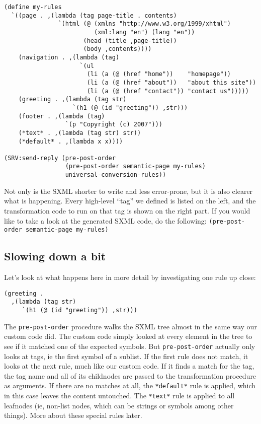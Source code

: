 \documentclass{article}
\begin{document}
\begin{verbatim}
(define my-rules
  `((page . ,(lambda (tag page-title . contents)
               `(html (@ (xmlns "http://www.w3.org/1999/xhtml")
                         (xml:lang "en") (lang "en"))
                      (head (title ,page-title))
                      (body ,contents))))
    (navigation . ,(lambda (tag)
                     `(ul
                       (li (a (@ (href "home"))    "homepage"))
                       (li (a (@ (href "about"))   "about this site"))
                       (li (a (@ (href "contact")) "contact us")))))
    (greeting . ,(lambda (tag str)
                   `(h1 (@ (id "greeting")) ,str)))
    (footer . ,(lambda (tag)
                 `(p "Copyright (c) 2007")))
    (*text* . ,(lambda (tag str) str))
    (*default* . ,(lambda x x))))

(SRV:send-reply (pre-post-order
                 (pre-post-order semantic-page my-rules)
                 universal-conversion-rules))
\end{verbatim}

Not only is the SXML shorter to write and less error-prone, but it is
also clearer what is happening.  Every high-level ``tag'' we defined
is listed on the left, and the transformation code to run on that tag
is shown on the right part.  If you would like to take a look at the
generated SXML code, do the following:
\verb|(pre-post-order semantic-page my-rules)|


\subsection{Slowing down a bit}

Let's look at what happens here in more detail by investigating one
rule up close:

\begin{verbatim}
(greeting .
  ,(lambda (tag str)
     `(h1 (@ (id "greeting")) ,str)))
\end{verbatim}

The \verb|pre-post-order| procedure walks the SXML tree almost in the
same way our custom code did.  The custom code simply looked at every
element in the tree to see if it matched one of the expected symbols.
But \verb|pre-post-order| actually only looks at tags, ie the first
symbol of a sublist.  If the first rule does not match, it looks at
the next rule, much like our custom code.  If it finds a match for the
tag, the tag name and all of its childnodes are passed to the
transformation procedure as arguments.  If there are no matches at all,
the \verb|*default*| rule is applied, which in this case leaves the
content untouched.  The \verb|*text*| rule is applied to all leafnodes
(ie, non-list nodes, which can be strings or symbols among other
things).  More about these special rules later.
\end{document}
